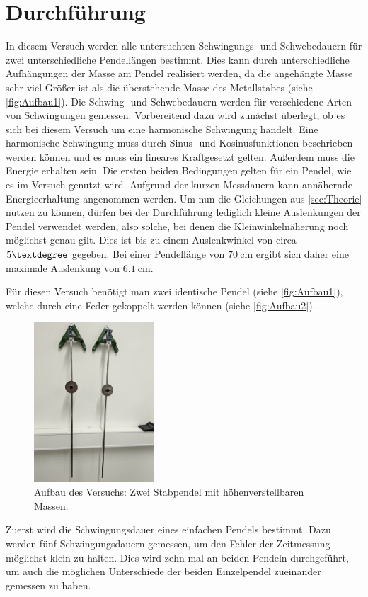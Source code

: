 \section{Durchführung}
\label{sec:Durchführung}
In diesem Versuch werden alle untersuchten Schwingungs- und Schwebedauern für zwei unterschiedliche Pendellängen bestimmt. Dies kann durch unterschiedliche Aufhängungen der Masse am 
Pendel realisiert werden, da die angehängte Masse sehr viel Größer ist als die überstehende Masse des Metallstabes (siehe \autoref{fig:Aufbau1}).
Die Schwing- und Schwebedauern werden für verschiedene Arten von Schwingungen gemessen. Vorbereitend dazu wird zunächst überlegt, ob es sich bei diesem Versuch um eine 
harmonische Schwingung handelt. Eine harmonische Schwingung muss durch  Sinus- und Kosinusfunktionen beschrieben werden können und es muss ein lineares Kraftgesetzt gelten.
Außerdem muss die Energie erhalten sein. Die ersten beiden Bedingungen gelten für ein Pendel, wie es im Versuch genutzt wird. Aufgrund der kurzen Messdauern kann annähernde 
Energieerhaltung angenommen werden. Um nun die Gleichungen aus \autoref{sec:Theorie} nutzen zu können, dürfen bei der Durchführung lediglich kleine Auslenkungen der Pendel 
verwendet werden, also solche, bei denen die Kleinwinkelnäherung noch möglichst genau gilt. Dies ist bis zu einem Auslenkwinkel von circa $5\textdegree$ gegeben. Bei einer 
Pendellänge von $70\:\unit{\centi\metre}$ ergibt sich daher eine maximale Auslenkung von $6.1\:\unit{\centi\metre}$.


Für diesen Versuch benötigt man zwei identische Pendel (siehe \autoref{fig:Aufbau1}), welche durch eine Feder gekoppelt werden können (siehe \autoref{fig:Aufbau2}).
\begin{figure}
    \centering
    \includegraphics[width=0.4\textwidth]{content/Einzelpendel.jpg}
	\caption{Aufbau des Versuchs: Zwei Stabpendel mit höhenverstellbaren Massen.}
	\label{fig:Aufbau1}
\end{figure}
Zuerst wird die Schwingungsdauer eines einfachen Pendels bestimmt. Dazu werden fünf Schwingungsdauern gemessen, um den Fehler der Zeitmessung möglichst klein zu halten.
Dies wird zehn mal an beiden Pendeln durchgeführt, um auch die möglichen Unterschiede der beiden Einzelpendel zueinander gemessen zu haben. 


